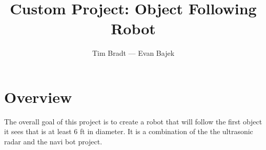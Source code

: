 \documentclass[]{article}
\title{Custom Project: Object Following Robot}
\author{
            Tim Bradt
     ---
            Evan Bajek
    }
\date{}
\begin{document}
\maketitle

\doublespacing
\section{Overview}\label{overview}

The overall goal of this project is to create a robot that will follow
the first object it sees that is at least 6 ft in diameter. It is a
combination of the the ultrasonic radar and the navi bot project.
\singlespacing
\end{document}
